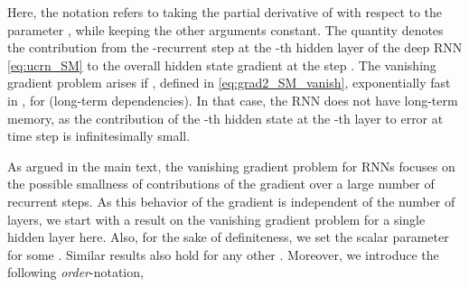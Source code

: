 \documentclass{article}
\begin{document}
Here, the notation  refers to taking the partial derivative of  with respect to the parameter , while keeping the other arguments constant.  The quantity  denotes the contribution from the -recurrent step at the -th hidden layer of the deep RNN \eqref{eq:ucrn_SM} to the overall hidden state gradient at the step . The vanishing gradient problem \citep{vanish_grad} arises if , defined in \eqref{eq:grad2_SM_vanish},  exponentially fast in , for  (long-term dependencies). In that case, the RNN does not have long-term memory, as the contribution of the -th hidden state at the -th layer to error at time step  is infinitesimally small. 

As argued in the main text, the vanishing gradient problem for RNNs focuses on the possible smallness of contributions of the gradient over a large number of recurrent steps. As this behavior of the gradient is independent of the number of layers, we start with a result on the vanishing gradient problem for a single hidden layer here. Also, for the sake of definiteness, we set the scalar parameter  for some . Similar results also hold for any other . Moreover, we introduce the following \emph{order}-notation,
\end{document}
